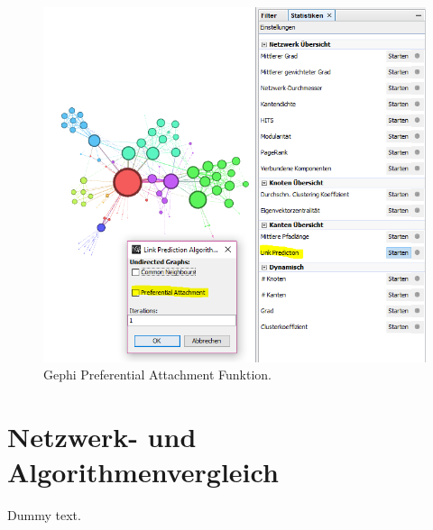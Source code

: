 \begin{figure}[htbp]
    \includegraphics[width=\linewidth]{resources/gephi-PA.png}
    \caption{Gephi Preferential Attachment Funktion.}
    \label{fig:screen9}
\end{figure}

\section{Netzwerk- und Algorithmenvergleich}

Dummy text.
